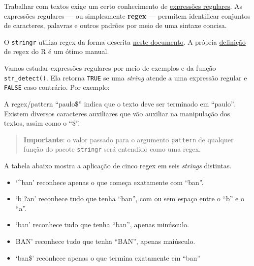 \documentclass[
]{book}
\newenvironment{Shaded}{\begin{snugshade}}{\end{snugshade}}
\newcommand{\AttributeTok}[1]{\textcolor[rgb]{0.77,0.63,0.00}{#1}}
\newcommand{\DocumentationTok}[1]{\textcolor[rgb]{0.56,0.35,0.01}{\textbf{\textit{#1}}}}
\newcommand{\FunctionTok}[1]{\textcolor[rgb]{0.00,0.00,0.00}{#1}}
\newcommand{\NormalTok}[1]{#1}
\newcommand{\StringTok}[1]{\textcolor[rgb]{0.31,0.60,0.02}{#1}}
\begin{document}
Trabalhar com textos exige um certo conhecimento de \href{https://pt.wikipedia.org/wiki/Express\%C3\%A3o_regular}{expressões regulares}. As expressões regulares --- ou simplesmente \textbf{regex} --- permitem identificar conjuntos de caracteres, palavras e outros padrões por meio de uma sintaxe concisa.

O \texttt{stringr} utiliza regex da forma descrita \href{http://www.gagolewski.com/software/stringi/manual/?manpage=stringi-search-regex}{neste documento}. A própria \href{https://stat.ethz.ch/R-manual/R-devel/library/base/html/regex.html}{definição} de regex do R é um ótimo manual.

Vamos estudar expressões regulares por meio de exemplos e da função \texttt{str\_detect()}. Ela retorna \texttt{TRUE} se uma \emph{string} atende a uma expressão regular e \texttt{FALSE} caso contrário. Por exemplo:

\begin{Shaded}
\end{Shaded}

A regex/pattern ``paulo\$'' indica que o texto deve ser terminado em ``paulo''. Existem diversos caracteres auxiliares que vão auxiliar na manipulação dos textos, assim como o ``\$''.

\begin{quote}
\textbf{Importante}: o valor passado para o argumento \texttt{pattern} de qualquer função do pacote \texttt{stringr} será entendido como uma regex.
\end{quote}

A tabela abaixo mostra a aplicação de cinco regex em seis \emph{strings} distintas.

\begin{itemize}
\item
  `\^{}ban' reconhece apenas o que começa exatamente com ``ban''.
\item
  `b ?an' reconhece tudo que tenha ``ban'', com ou sem espaço entre o ``b'' e o ``a''.
\item
  `ban' reconhece tudo que tenha ``ban'', apenas minúsculo.
\item
  BAN' reconhece tudo que tenha ``BAN'', apenas maiúsculo.
\item
  `ban\$' reconhece apenas o que termina exatamente em ``ban''
\end{itemize}
\end{document}
